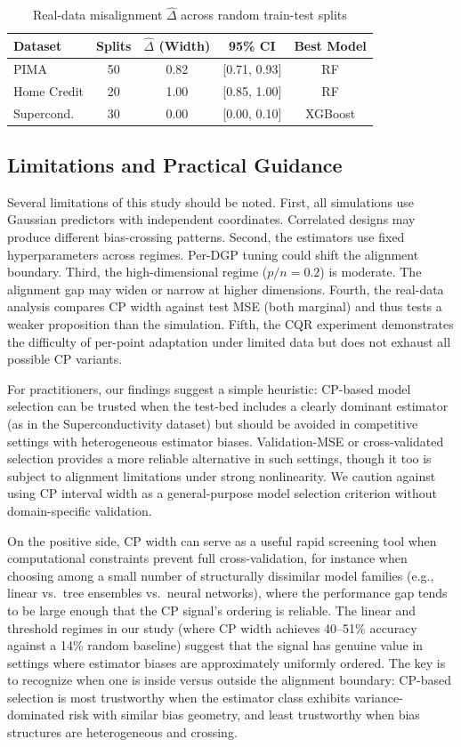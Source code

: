 \documentclass[pdflatex,sn-mathphys-ay]{sn-jnl}%
\theoremstyle{thmstyleone}%
\theoremstyle{thmstyletwo}%
\theoremstyle{thmstylethree}%
\begin{document}
\begin{table}[t]
    \centering
    \caption{Real-data misalignment $\hat{\Delta}$ across random train-test splits}
    \label{tab:real}
    \begin{tabular}{lcccc}
        \toprule
        Dataset & Splits & $\hat{\Delta}$ (Width) & 95\% CI & Best Model \\
        \midrule
        PIMA            & 50 & 0.82 & [0.71, 0.93] & RF \\
        Home Credit     & 20 & 1.00 & [0.85, 1.00] & RF \\
        Supercond.      & 30 & 0.00 & [0.00, 0.10] & XGBoost \\
        \bottomrule
    \end{tabular}
\end{table}

\subsection*{Limitations and Practical Guidance}
Several limitations of this study should be noted. First, all simulations use Gaussian predictors with independent coordinates. Correlated designs may produce different bias-crossing patterns. Second, the estimators use fixed hyperparameters across regimes. Per-DGP tuning could shift the alignment boundary. Third, the high-dimensional regime ($p/n = 0.2$) is moderate. The alignment gap may widen or narrow at higher dimensions. Fourth, the real-data analysis compares CP width against test MSE (both marginal) and thus tests a weaker proposition than the simulation. Fifth, the CQR experiment demonstrates the difficulty of per-point adaptation under limited data but does not exhaust all possible CP variants.

For practitioners, our findings suggest a simple heuristic: CP-based model selection can be trusted when the test-bed includes a clearly dominant estimator (as in the Superconductivity dataset) but should be avoided in competitive settings with heterogeneous estimator biases. Validation-MSE or cross-validated selection provides a more reliable alternative in such settings, though it too is subject to alignment limitations under strong nonlinearity. We caution against using CP interval width as a general-purpose model selection criterion without domain-specific validation.

On the positive side, CP width can serve as a useful rapid screening tool when computational constraints prevent full cross-validation, for instance when choosing among a small number of structurally dissimilar model families (e.g., linear vs.\ tree ensembles vs.\ neural networks), where the performance gap tends to be large enough that the CP signal's ordering is reliable. The linear and threshold regimes in our study (where CP width achieves 40--51\% accuracy against a 14\% random baseline) suggest that the signal has genuine value in settings where estimator biases are approximately uniformly ordered. The key is to recognize when one is inside versus outside the alignment boundary: CP-based selection is most trustworthy when the estimator class exhibits variance-dominated risk with similar bias geometry, and least trustworthy when bias structures are heterogeneous and crossing.
\end{document}
